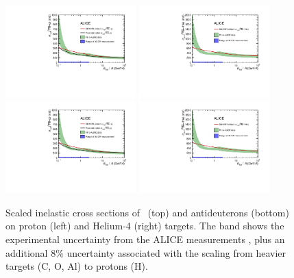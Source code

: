 \begin{figure}
    \centering
    \includegraphics[width=0.45\textwidth]{figures/Antihelum_on_p_targets_scaled_with_paramterisation.pdf}
    \includegraphics[width=0.45\textwidth]{figures/Antihelum_on_p_targets_scaled.pdf}
     \includegraphics[width=0.45\textwidth]{figures/Antihelum_on_p_targets_scaled_with_paramterisation.pdf}
    \includegraphics[width=0.45\textwidth]{figures/Antihelum_on_p_targets_scaled.pdf}
    \caption{Scaled inelastic cross sections of \ahe\ (top) and antideuterons (bottom) on proton (left) and Helium-4 (right) targets. The band shows the experimental uncertainty from the ALICE measurements \cite{}, plus an additional 8\% uncertainty associated with the scaling from heavier targets (C, O, Al) to protons (H).}
    \label{fig:ScaledXS_ahe_adeut}
\end{figure}


